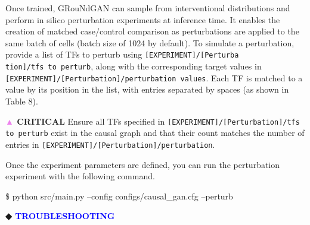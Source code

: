 \begin{tcolorbox}
Once trained, GRouNdGAN can sample from interventional distributions and perform in silico
perturbation experiments at inference time. It enables the creation of matched case/control
comparison as perturbations are applied to the same batch of cells (batch size of 1024 by default).
To simulate a perturbation, provide a list of TFs to perturb using
\texttt{[EXPERIMENT]/[Perturba\\tion]/tfs to perturb}, along with the corresponding target
values in \texttt{[EXPERIMENT]/[Per\allowbreak turbation]/perturbation values}. Each TF is matched to
a value by its position in the list, with entries separated by spaces (as shown in Table 8).

\begin{table}[!t]
	\caption[Arguments relevant to the perturbation command in the configuration file.]{Arguments relevant to the perturbation command in the configuration file.} \label{tab:protocol_table8}
\end{table}

\textbf{\textcolor{violet}{▲} CRITICAL} Ensure all TFs specified in \texttt{[EXPERIMENT]/[Pe\allowbreak rturbation]/tfs to perturb}
exist in the causal graph and that their count matches the number of entries in \texttt{[EXPERIMENT]/[Pe\allowbreak rturbation]/perturbation}. 

Once the experiment parameters are defined, you can run the perturbation experiment with the
following command.
\begin{codeblock}
\$ python src/main.py --config configs/causal\_gan.cfg –perturb
\end{codeblock}
\textbf{◆ \textcolor{blue}{TROUBLESHOOTING}}


\end{tcolorbox}
